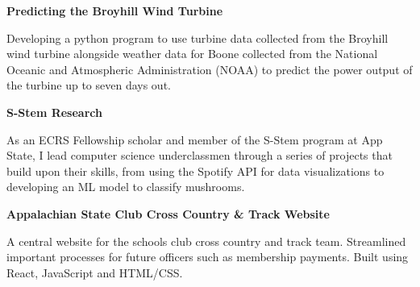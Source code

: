 
\begin{cventries}

  \cventry
    {\textbf{Predicting the Broyhill Wind Turbine}} %
    {} %
    {} %
    {}
    {
      \begin{cvitems} %
        \item {Developing a python program to use turbine data collected from the Broyhill wind turbine alongside weather data for Boone collected from the National Oceanic and Atmospheric Administration (NOAA) to predict the power output of the turbine up to seven days out.}
      \end{cvitems}
    }

  \cventry
    {\textbf{S-Stem Research}} %
    {} %
    {} %
    {} %
    {
      \begin{cvitems} %
        \item {As an ECRS Fellowship scholar and member of the S-Stem program at App State, I lead computer science underclassmen through a series of projects that build upon their skills, from using the Spotify API for data visualizations to developing an ML model to classify mushrooms.}
      \end{cvitems}
    }

   \cventry
    {\textbf{Appalachian State Club Cross Country \& Track Website}} %
    {} %
    {} %
    {} %
    {
      \begin{cvitems} %
        \item {A central website for the schools club cross country and track team. Streamlined important processes for future officers such as membership payments. Built using React, JavaScript and HTML/CSS.}
      \end{cvitems}
     }


\end{cventries}
